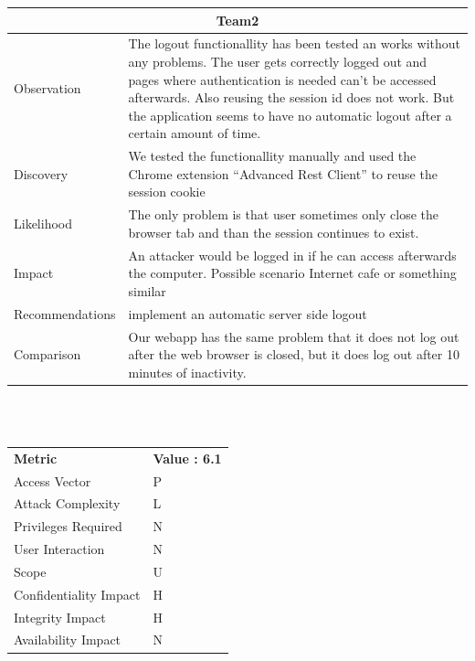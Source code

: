 \documentclass[headsepline,footsepline,footinclude=false,oneside,fontsize=11pt,paper=a4,listof=totoc,bibliography=totoc]{scrbook} %
\begin{document}
\begin{tabular}{ l|p{11cm}  }
	\hline
	\multicolumn{2}{c}{\textbf{Team2}} \\
	\hline
	Observation & The logout functionallity has been tested an works without any problems.
	The user gets correctly logged out and pages where authentication is needed can't be accessed afterwards.
	Also reusing the session id does not work. But the application seems to have no automatic
	logout after a certain amount of time.\\
	Discovery & We tested the functionallity manually and used the Chrome extension ``Advanced Rest Client'' to reuse the session cookie \\
	Likelihood & The only problem is that user sometimes only close the browser tab and than the session continues to exist.\\
	Impact & An attacker would be logged in if he can access afterwards the computer. Possible scenario Internet cafe	or something similar\\
	Recommendations & implement an automatic server side logout\\
	Comparison & Our webapp has the same problem that it does not log out after the web browser is closed, but it does log out after 10 minutes of inactivity.\\
	\hline
\end{tabular}
\\
\vspace{0.5cm}
\\
\begin{center}
	\begin{tabular}{ll}
		\rowcolor[HTML]{34CDF9}
		{\color[HTML]{ECF4FF} \textbf{Metric}}        & {\color[HTML]{ECF4FF} \textbf{Value : 6.1}} \\
		\rowcolor[HTML]{BBDAFF}
		{\color[HTML]{333333} Access Vector}          & {\color[HTML]{333333} } P             \\
		\rowcolor[HTML]{ECF4FF}
		{\color[HTML]{333333} Attack Complexity}      & {\color[HTML]{333333} } L              \\
		\rowcolor[HTML]{BBDAFF}
		{\color[HTML]{333333} Privileges Required}    & {\color[HTML]{333333} } N              \\
		\rowcolor[HTML]{ECF4FF}
		{\color[HTML]{333333} User Interaction}       & {\color[HTML]{333333} } N              \\
		\rowcolor[HTML]{BBDAFF}
		{\color[HTML]{333333} Scope}                  & {\color[HTML]{333333} } U              \\
		\rowcolor[HTML]{ECF4FF}
		{\color[HTML]{333333} Confidentiality Impact} & {\color[HTML]{333333} } H              \\
		\rowcolor[HTML]{BBDAFF}
		{\color[HTML]{333333} Integrity Impact}       & {\color[HTML]{333333} } H              \\
		\rowcolor[HTML]{ECF4FF}
		{\color[HTML]{333333} Availability Impact}    & {\color[HTML]{333333} } N
	\end{tabular}
\end{center}
\end{document}

